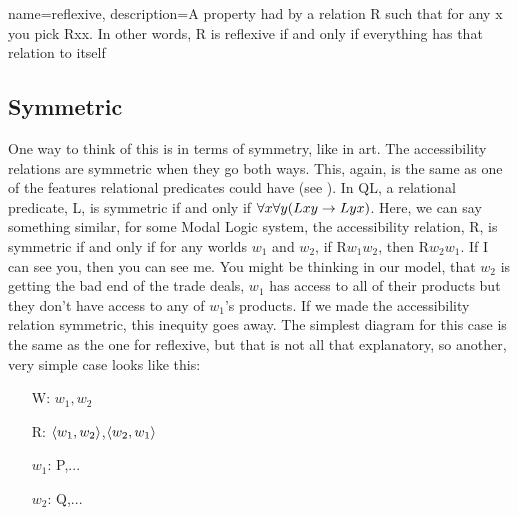  
{
name=reflexive,
description={A property had by a relation R such that for any x you pick Rxx. In other words, R is reflexive if and only if everything has that relation to itself}
}
\subsection{Symmetric}

One way to think of this is in terms of symmetry, like in art. The accessibility relations are \gls{symmetric} when they go both ways. This, again, is the same as one of the features relational predicates could have (see ). In QL, a relational predicate, L, is symmetric if and only if $\forall x \forall y (Lxy \rightarrow Lyx)$. Here, we can say something similar, for some Modal Logic system, the accessibility relation, R, is symmetric if and only if for any worlds $w_1$ and $w_2$, if R$w_1$$w_2$, then R$w_2$$w_1$.  If I can see you, then you can see me. You might be thinking in our model, that $w_2$ is getting the bad end of the trade deals, $w_1$ has access to all of their products but they don't have access to any of $w_1$'s products. If we made the accessibility relation symmetric, this inequity goes away. The simplest diagram for this case is the same as the one for reflexive, but that is not all that explanatory, so another, very simple case looks like this:

\begin{center}
\end{center}
\begin{itemize}
\item[W:] $w_1,w_2$
\item[R:]$\langle w_1,w_2\rangle$,$\langle w_2,w_1\rangle$  
\item[$w_1$:] P,...
\item[$w_2$:] Q,...
\end{itemize}


